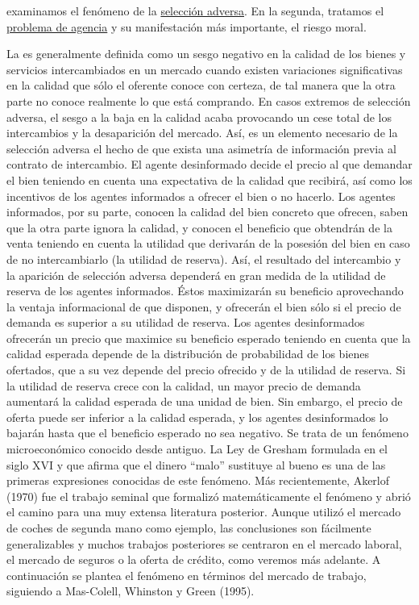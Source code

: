 \documentclass{nuevotema}
\begin{document}
examinamos el fenómeno de la \underline{selección adversa}. En la segunda, tratamos el \underline{problema de agencia} y su manifestación más importante, el riesgo moral. 

La  es generalmente definida como un sesgo negativo en la calidad de los bienes y servicios intercambiados en un mercado cuando existen variaciones significativas en la calidad que sólo el oferente conoce con certeza, de tal manera que la otra parte no conoce realmente lo que está comprando. En casos extremos de selección adversa, el sesgo a la baja en la calidad acaba provocando un cese total de los intercambios y la desaparición del mercado. Así, es un elemento necesario de la selección adversa el hecho de que exista una asimetría de información previa al contrato de intercambio. El agente desinformado decide el precio al que demandar el bien teniendo en cuenta una expectativa de la calidad que recibirá, así como los incentivos de los agentes informados a ofrecer el bien o no hacerlo. Los agentes informados, por su parte, conocen la calidad del bien concreto que ofrecen, saben que la otra parte ignora la calidad, y conocen el beneficio que obtendrán de la venta teniendo en cuenta la utilidad que derivarán de la posesión del bien en caso de no intercambiarlo (la utilidad de reserva). Así, el resultado del intercambio y la aparición de selección adversa dependerá en gran medida de la utilidad de reserva de los agentes informados. Éstos maximizarán su beneficio aprovechando la ventaja informacional de que disponen, y ofrecerán el bien sólo si el precio de demanda es superior a su utilidad de reserva. Los agentes desinformados ofrecerán un precio que maximice su beneficio esperado teniendo en cuenta que la calidad esperada depende de la distribución de probabilidad de los bienes ofertados, que a su vez depende del precio ofrecido y de la utilidad de reserva. Si la utilidad de reserva crece con la calidad, un mayor precio de demanda aumentará la calidad esperada de una unidad de bien. Sin embargo, el precio de oferta puede ser inferior a la calidad esperada, y los agentes desinformados lo bajarán hasta que el beneficio esperado no sea negativo. Se trata de un fenómeno microeconómico conocido desde antiguo. La Ley de Gresham formulada en el siglo XVI y que afirma que el dinero ``malo'' sustituye al bueno es una de las primeras expresiones conocidas de este fenómeno. Más recientemente, Akerlof (1970) fue el trabajo seminal que formalizó matemáticamente el fenómeno y abrió el camino para una muy extensa literatura posterior. Aunque utilizó el mercado de coches de segunda mano como ejemplo, las conclusiones son fácilmente generalizables y muchos trabajos posteriores se centraron en el mercado laboral, el mercado de seguros o la oferta de crédito, como veremos más adelante. A continuación se plantea el fenómeno en términos del mercado de trabajo, siguiendo a Mas-Colell, Whinston y Green (1995).
\end{document}
